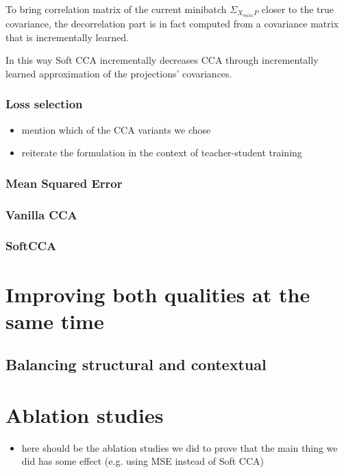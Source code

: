 To bring correlation matrix of the current minibatch $\Sigma_{X_{mini}P}$
closer to the true covariance, the decorrelation part is in fact computed from
a covariance matrix that is incrementally learned.

In this way Soft CCA incrementally decreases CCA through incrementally learned
approximation of the projections' covariances.

\subsubsection{Loss selection}

\begin{itemize}
    \item mention which of the CCA variants we chose
    \item reiterate the formulation in the context of teacher-student training
\end{itemize}

\subsubsection{Mean Squared Error}
\subsubsection{Vanilla CCA}
\subsubsection{SoftCCA}

\section{Improving both qualities at the same time}\label{section:improving_both}
\subsection{Balancing structural and contextual}


\section{Ablation studies}

\begin{itemize}
    \item here should be the ablation studies we did to prove that the main
        thing we did has some effect (e.g. using MSE instead of Soft CCA)
\end{itemize}
